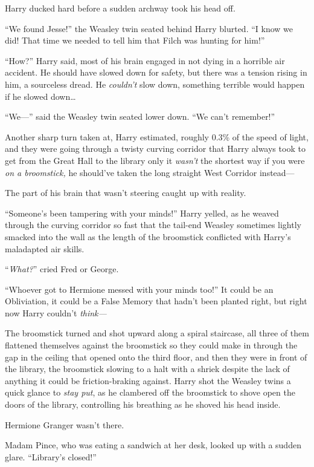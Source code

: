 Harry ducked hard before a sudden archway took his head off.

“We found Jesse!” the Weasley twin seated behind Harry blurted. “I know we did! That time we needed to tell him that Filch was hunting for him!”

“How?” Harry said, most of his brain engaged in not dying in a horrible air accident. He should have slowed down for safety, but there was a tension rising in him, a sourceless dread. He \emph{couldn’t} slow down, something terrible would happen if he slowed down…

“We—” said the Weasley twin seated lower down. “We can’t remember!”

Another sharp turn taken at, Harry estimated, roughly 0.3\% of the speed of light, and they were going through a twisty curving corridor that Harry always took to get from the Great Hall to the library only it \emph{wasn’t} the shortest way if you were \emph{on a broomstick,} he should’ve taken the long straight West Corridor instead—

The part of his brain that wasn’t steering caught up with reality.

“Someone’s been tampering with your minds!” Harry yelled, as he weaved through the curving corridor so fast that the tail-end Weasley sometimes lightly smacked into the wall as the length of the broomstick conflicted with Harry’s maladapted air skills.

“\emph{What?}” cried Fred or George.

“Whoever got to Hermione messed with your minds too!” It could be an Obliviation, it could be a False Memory that hadn’t been planted right, but right now Harry couldn’t \emph{think—}

The broomstick turned and shot upward along a spiral staircase, all three of them flattened themselves against the broomstick so they could make in through the gap in the ceiling that opened onto the third floor, and then they were in front of the library, the broomstick slowing to a halt with a shriek despite the lack of anything it could be friction-braking against. Harry shot the Weasley twins a quick glance to \emph{stay put}, as he clambered off the broomstick to shove open the doors of the library, controlling his breathing as he shoved his head inside.

Hermione Granger wasn’t there.

Madam Pince, who was eating a sandwich at her desk, looked up with a sudden glare. “Library’s closed!”

